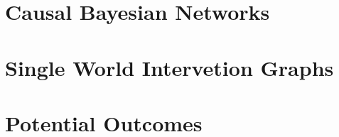 \section{Causal Bayesian Networks}



\section{Single World Intervetion Graphs}

\section{Potential Outcomes}